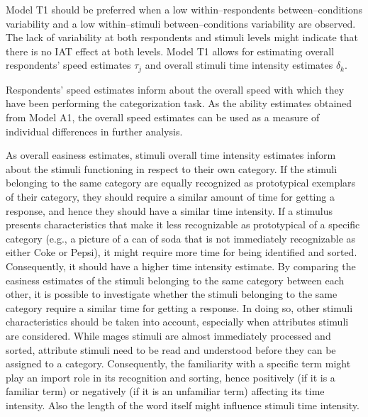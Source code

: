 \documentclass{book}
\begin{document}
Model T1 should be preferred when a low within--respondents between--conditions variability and a low within--stimuli between--conditions variability are observed. 
The lack of variability at both respondents and stimuli levels might indicate that there is no IAT effect at both levels. 
Model T1 allows for estimating overall respondents' speed estimates $\tau_{j}$ and overall stimuli time intensity estimates $\delta_k$. 

Respondents' speed estimates inform about the overall speed with which they have been performing the categorization task. As the ability estimates obtained from Model A1, the overall speed estimates can be used as a measure of individual differences in further analysis. 

As overall easiness estimates, stimuli overall time intensity estimates inform about the stimuli functioning in respect to their own category. 
If the stimuli belonging to the same category are equally recognized as prototypical exemplars of their category, they should require a similar amount of time for getting a response, and hence they should have a similar time intensity. 
If a stimulus presents characteristics that make it less recognizable as prototypical of a specific category (e.g., a picture of a can of soda that is not immediately recognizable as either Coke or Pepsi), it might require more time for being identified and sorted. Consequently, it should have a higher time intensity estimate. 
 By comparing the easiness estimates of the stimuli belonging to the same category between each other, it is possible to investigate whether the stimuli belonging to the same category require a similar time for getting a response. 
 In doing so, other stimuli characteristics should be taken into account, especially when attributes stimuli are considered. While mages stimuli are almost immediately processed and sorted, attribute stimuli need to be read and understood before they can be assigned to a category. Consequently, the familiarity with a specific term might play an import role in its recognition and sorting, hence positively (if it is a familiar term) or negatively (if it is an unfamiliar term) affecting its time intensity. Also the length of the word itself might influence stimuli time intensity. 
\end{document}
